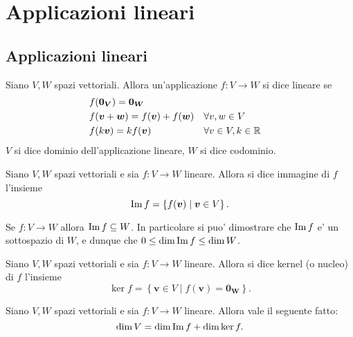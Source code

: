 \chapter{Applicazioni lineari}

\section{Applicazioni lineari}

\begin{definition}
    Siano $V, W$ spazi vettoriali. Allora un'applicazione $f : V \to W$ si dice lineare
    se
    \begin{align}
        &f(\bm{0_V}) = \bm{0_W} \\
        &f(\bm{v} + \bm{w}) = f(\bm{v}) + f(\bm{w}) &&\forall v, w \in V \\
        &f(k\bm{v}) = kf(\bm{v})                    &&\forall v\in V, k \in \mathbb{R} 
    \end{align}
    $V$ si dice dominio dell'applicazione lineare, $W$ si dice codominio.
\end{definition}

\begin{definition}
    Siano $V, W$ spazi vettoriali e sia $f : V \to W$ lineare. Allora si dice immagine di $f$ l'insieme \begin{equation}
        \operatorname{Im}f = \left\{ f(\bm{v}) \mid \bm v \in V\right\}.
    \end{equation}
\end{definition}

\begin{remark}
    Se $f : V \to W$ allora $\operatorname{Im}f \subseteq W$. In particolare si puo' dimostrare che $\operatorname{Im}f$ e' un sottospazio di $W$, e dunque che $0 \leq \dim\operatorname{Im}f \leq \dim W$.
\end{remark}

\begin{definition}
    Siano $V, W$ spazi vettoriali e sia $f : V \to W$ lineare. Allora si dice kernel (o nucleo) di $f$ l'insieme \begin{equation}
        \ker{f} = \left\{ \bm{v} \in V \mid f(\bm v) = \bm{0_W}\right\}.
    \end{equation}
\end{definition}

\begin{theorem} 
     \label{th_dimensioni}
    Siano $V, W$ spazi vettoriali e sia $f : V \to W$ lineare. Allora vale il seguente fatto:
    \begin{equation}
        \dim V = \dim \operatorname{Im}f + \dim \ker f.
    \end{equation}
\end{theorem}

